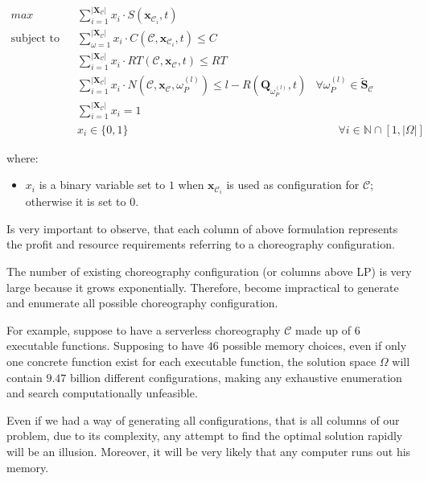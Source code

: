 \documentclass[12pt,a4paper]{report}
\newcommand{\N}{\mathbb{N}}
\begin{document}
\begin{align}
\displaystyle max \qquad & \displaystyle \sum_{i = 1}^{|\textbf{X}_{\mathcal{C}}|} x_i \cdot S(\textbf{x}_{\mathcal{C}_i},t) \\
\text{subject to} \qquad & \displaystyle \sum_{\omega = 1}^{|\textbf{X}_{\mathcal{C}}|} x_i \cdot C(\mathcal{C},\textbf{x}_{\mathcal{C}_i}, t) \leq C \\
& \displaystyle \sum_{i = 1}^{|\textbf{X}_{\mathcal{C}}|} x_i \cdot RT(\mathcal{C},\textbf{x}_{\mathcal{C}}, t) \leq RT \\ 
& \displaystyle \sum_{i = 1}^{|\textbf{X}_{\mathcal{C}}|} x_i \cdot N(\mathcal{C},\textbf{x}_{\mathcal{C}}, \omega_{P}^{(l)}) \leq l - R(\textbf{Q}_{\omega_{P}^{(l)}}, t) &  \forall \omega_{P}^{(l)} \in \widetilde{\textbf{S}}_{\mathcal{C}} \\
& \displaystyle \sum_{i = 1}^{|\textbf{X}_{\mathcal{C}}|} x_i = 1 & \\
& x_i \in \lbrace 0, 1 \rbrace & \qquad \forall i \in \N \cap [1,|\Omega|]
\end{align}

where:

\begin{itemize}
	\item $x_i$ is a binary variable set to $1$ when  $\textbf{x}_{\mathcal{C}_i}$ is used as configuration for $\mathcal{C}$; otherwise it is set to $0$.
\end{itemize}

Is very important to observe, that each column of above formulation represents the profit and resource requirements referring to a choreography configuration.

The number of existing choreography configuration (or columns above LP) is very large because it grows exponentially. Therefore, become impractical to generate and enumerate all possible choreography configuration.

For example, suppose to have a serverless choreography $\mathcal{C}$ made up of $6$ executable functions. Supposing to have $46$ possible memory choices, even if only one concrete function exist for each executable function, the solution space $\Omega$ will contain $9.47$ billion different configurations, making any exhaustive enumeration and search computationally unfeasible. 

Even if we had a way of generating all configurations, that is all columns of our problem, due to its complexity, any attempt to find the optimal solution rapidly will be an illusion. Moreover, it will be very likely that any computer runs out his memory.
\end{document}

